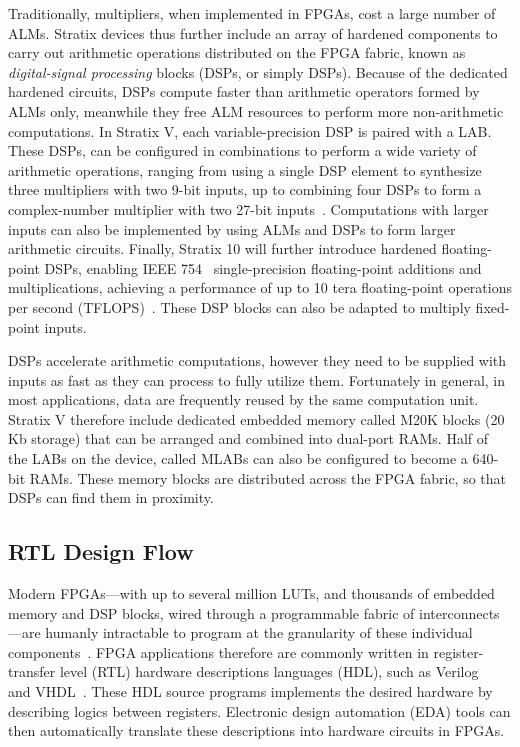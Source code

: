 Traditionally, multipliers, when implemented in FPGAs, cost a large number of
ALMs.  Stratix devices thus further include an array of hardened components
to carry out arithmetic operations distributed on the FPGA fabric, known as
\emph{digital-signal processing} blocks (DSPs, or simply DSPs).  Because
of the dedicated hardened circuits, DSPs compute faster than arithmetic
operators formed by ALMs only, meanwhile they free ALM resources to perform
more non-arithmetic computations.  In Stratix V, each variable-precision
DSP is paired with a LAB\@.  These DSPs, can be configured in
combinations to perform a wide variety of arithmetic operations, ranging from
using a single DSP element to synthesize three multipliers with two 9-bit
inputs, up to combining four DSPs to form a complex-number multiplier
with two 27-bit inputs~\cite{stratix5}.  Computations with larger inputs can
also be implemented by using ALMs and DSPs to form larger arithmetic
circuits.  Finally, Stratix 10 will further introduce hardened floating-point
DSPs, enabling IEEE 754~\cite{ieee754} single-precision floating-point
additions and multiplications, achieving a performance of up to 10 tera
floating-point operations per second (TFLOPS)~\cite{stratix10fp}.  These DSP
blocks can also be adapted to multiply fixed-point inputs.

DSPs accelerate arithmetic computations, however they need to be supplied
with inputs as fast as they can process to fully utilize them.  Fortunately
in general, in most applications, data are frequently reused by the same
computation unit.  Stratix V therefore include dedicated embedded memory called
M20K blocks (20 Kb storage) that can be arranged and combined into dual-port
RAMs.  Half of the LABs on the device, called MLABs can also be configured to
become a 640-bit RAMs.  These memory blocks are distributed across the FPGA
fabric, so that DSPs can find them in proximity.


\subsection{RTL Design Flow}
\label{bg:sub:rtl_design}

Modern FPGAs---with up to several million LUTs, and thousands of
embedded memory and DSP blocks, wired through a programmable fabric of
interconnects---are humanly intractable to program at the granularity of these
individual components~\cite{kapre08}.  FPGA applications therefore are commonly
written in register-transfer level (RTL) hardware descriptions languages (HDL),
such as Verilog~\cite{verilog} and VHDL~\cite{vhdl}.  These HDL source programs
implements the desired hardware by describing logics between registers.
Electronic design automation (EDA) tools can then automatically translate these
descriptions into hardware circuits in FPGAs.

